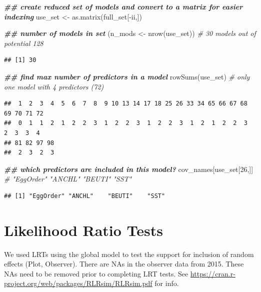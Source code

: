 \documentclass[
]{article}
\newenvironment{Shaded}{\begin{snugshade}}{\end{snugshade}}
\newcommand{\CommentTok}[1]{\textcolor[rgb]{0.56,0.35,0.01}{\textit{#1}}}
\newcommand{\DecValTok}[1]{\textcolor[rgb]{0.00,0.00,0.81}{#1}}
\newcommand{\DocumentationTok}[1]{\textcolor[rgb]{0.56,0.35,0.01}{\textbf{\textit{#1}}}}
\newcommand{\FunctionTok}[1]{\textcolor[rgb]{0.00,0.00,0.00}{#1}}
\newcommand{\NormalTok}[1]{#1}
\newcommand{\OtherTok}[1]{\textcolor[rgb]{0.56,0.35,0.01}{#1}}
\newcommand{\SpecialCharTok}[1]{\textcolor[rgb]{0.00,0.00,0.00}{#1}}
\begin{document}
\begin{Shaded}
\begin{Highlighting}[]
\DocumentationTok{\#\# create reduced set of models and convert to a matrix for easier indexing}
\NormalTok{use\_set }\OtherTok{\textless{}{-}} \FunctionTok{as.matrix}\NormalTok{(full\_set[}\SpecialCharTok{{-}}\NormalTok{ii,]) }

\DocumentationTok{\#\# number of models in set}
\NormalTok{(n\_mods }\OtherTok{\textless{}{-}} \FunctionTok{nrow}\NormalTok{(use\_set)) }\CommentTok{\# 30 models out of potential 128}
\end{Highlighting}
\end{Shaded}

\begin{verbatim}
## [1] 30
\end{verbatim}

\begin{Shaded}
\begin{Highlighting}[]
\DocumentationTok{\#\# find max number of predictors in a model}
\FunctionTok{rowSums}\NormalTok{(use\_set) }\CommentTok{\# only one model with 4 predictors (72)}
\end{Highlighting}
\end{Shaded}

\begin{verbatim}
##  1  2  3  4  5  6  7  8  9 10 13 14 17 18 25 26 33 34 65 66 67 68 69 70 71 72 
##  0  1  1  2  1  2  2  3  1  2  2  3  1  2  2  3  1  2  1  2  2  3  2  3  3  4 
## 81 82 97 98 
##  2  3  2  3
\end{verbatim}

\begin{Shaded}
\begin{Highlighting}[]
\DocumentationTok{\#\# which predictors are included in this model?}
\NormalTok{cov\_names[use\_set[}\DecValTok{26}\NormalTok{,]] }\CommentTok{\# "EggOrder" "ANCHL"    "BEUTI"    "SST"  }
\end{Highlighting}
\end{Shaded}

\begin{verbatim}
## [1] "EggOrder" "ANCHL"    "BEUTI"    "SST"
\end{verbatim}

\hypertarget{likelihood-ratio-tests}{%
\section{Likelihood Ratio Tests}\label{likelihood-ratio-tests}}

We used LRTs using the global model to test the support for inclusion of
random effects (Plot, Observer). There are NAs in the observer data from
2015. These NAs need to be removed prior to completing LRT tests. See
\url{https://cran.r-project.org/web/packages/RLRsim/RLRsim.pdf} for
info.
\end{document}
